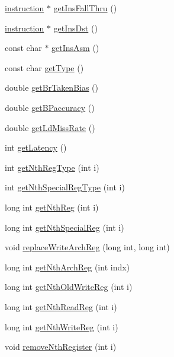 \begin{DoxyCompactItemize}
\item 
\hyperlink{classinstruction}{instruction} $\ast$ \hyperlink{classinstruction_a989b1f1fcfe6b80e1566f035e408b03d}{getInsFallThru} ()
\item 
\hyperlink{classinstruction}{instruction} $\ast$ \hyperlink{classinstruction_a1e19a31455d12c43d0f48d071f3e0e5c}{getInsDst} ()
\item 
const char $\ast$ \hyperlink{classinstruction_a9404c158382339e863846837c9b252aa}{getInsAsm} ()
\item 
const char \hyperlink{classinstruction_a47623362d505a662b974624f81288389}{getType} ()
\item 
double \hyperlink{classinstruction_ac2be260e8fce5e0615bd68bed97cb591}{getBrTakenBias} ()
\item 
double \hyperlink{classinstruction_a023333937041baf6bc2985c94f88c9e5}{getBPaccuracy} ()
\item 
double \hyperlink{classinstruction_a14d57791b666452fdb91973e35c39c2e}{getLdMissRate} ()
\item 
int \hyperlink{classinstruction_a842fd50e52a3e3d31fcf8b7a180a32bd}{getLatency} ()
\item 
int \hyperlink{classinstruction_a9701f53aafaf1b2298378665059cef33}{getNthRegType} (int i)
\item 
int \hyperlink{classinstruction_a4210fe4a5a94f67cdcd7c25075e8f23b}{getNthSpecialRegType} (int i)
\item 
long int \hyperlink{classinstruction_a54412da0ee022e05101d4fb92ee879b9}{getNthReg} (int i)
\item 
long int \hyperlink{classinstruction_a9f05970767f31d158fdb6beb0ae6a3df}{getNthSpecialReg} (int i)
\item 
void \hyperlink{classinstruction_aa52dbeed6a59d58a132a885cfabc70fb}{replaceWriteArchReg} (long int, long int)
\item 
long int \hyperlink{classinstruction_a7d49a66c0f3b426f1cf8fd335a5f3b6a}{getNthArchReg} (int indx)
\item 
long int \hyperlink{classinstruction_ad7dce7bff9bfecd11b0e7119738d0994}{getNthOldWriteReg} (int i)
\item 
long int \hyperlink{classinstruction_a0a5ddbb986096245d7742472c49d14b2}{getNthReadReg} (int i)
\item 
long int \hyperlink{classinstruction_a29e8de9d3cd22cee464512f9bbc1972c}{getNthWriteReg} (int i)
\item 
void \hyperlink{classinstruction_aabb46003e886f87cd3bc918f05a3682f}{removeNthRegister} (int i)

\end{DoxyCompactItemize}
